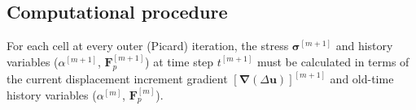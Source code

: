 \documentclass[sn-mathphys,Numbered,draft]{sn-jnl}%
\newcommand{\bb}{\boldsymbol}
\begin{document}
\subsection{Computational procedure}

For each cell at every outer (Picard) iteration, the stress $\bb{\sigma}^{[m+1]}$ and history variables ($\alpha^{[m+1]}$, $\bb{F}_p^{[m+1]}$) at time step $t^{[m+1]}$ must be calculated in terms of the current displacement increment gradient $[\bb{\nabla} (\Delta \bb{u})]^{[m+1]}$ and old-time history variables ($\alpha^{[m]}$, $\bb{F}_p^{[m]}$).

\end{document}
